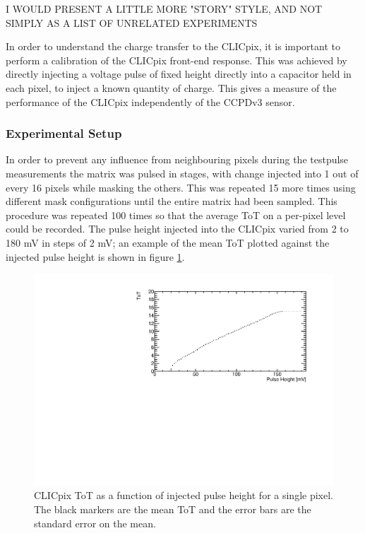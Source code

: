 
I WOULD PRESENT A LITTLE MORE "STORY" STYLE, AND NOT SIMPLY AS A LIST OF UNRELATED EXPERIMENTS

In order to understand the charge transfer to the CLICpix, it is important to perform a calibration of the CLICpix front-end response. This was achieved by directly injecting a voltage pulse of fixed height directly into a capacitor held in each pixel, to inject a known quantity of charge. This gives a measure of the performance of the CLICpix independently of the CCPDv3 sensor.  %


\subsubsection{Experimental Setup}

In order to prevent any influence from neighbouring pixels during the testpulse measurements the matrix was pulsed in stages, with change injected into 1 out of every 16 pixels while masking the others.  This was repeated 15 more times using different mask configurations until the entire matrix had been sampled. This procedure was repeated 100 times so that the average ToT on a per-pixel level could be recorded.  The pulse height injected into the CLICpix varied from 2 to 180 mV in steps of 2 mV;  an example of the mean ToT plotted against the injected pulse height is shown in figure \ref{fig:testpulseexamplenofit}.  

\begin{figure}
\centering
\includegraphics[width=1.0\textwidth]{CLICdpVertex/Plots/TestPulseCalibration/Fits/Set9/ToT_PulseHeight_Set_9_ChipID_001ec0db94b1_Pixel_x0_y0_NoFit.pdf}
\caption[CLICpix ToT as a function of injected pulse height.]{CLICpix ToT as a function of injected pulse height for a single pixel.  The black markers are the mean ToT and the error bars are the standard error on the mean.}
\label{fig:testpulseexamplenofit}
\end{figure}

